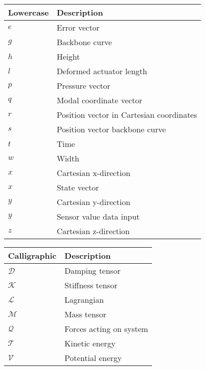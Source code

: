 \begin{spacing}{0.9}
\begin{multicols}{2}
\begin{table}[H]
\centering
    \begin{tabular}{p{1.7cm} p{4.8cm}} \hline
    \textbf{Lowercase}    &   \textbf{Description }\\ \hline
     $e$     & Error vector \\
     $g$     & Backbone curve \\
     $h$     & Height \\
     $l$     & Deformed actuator length \\
     $p$     & Pressure vector \\
     $q$     & Modal coordinate vector \\
     $r$     & Position vector in Cartesian coordinates \\
     $s$     & Position vector backbone curve \\
     $t$     & Time \\
     $w$     & Width \\
     $x$     & Cartesian x-direction \\
     $x$     & State vector \\
     $y$     & Cartesian y-direction \\
     $y$     & Sensor value data input \\
     $z$     & Cartesian z-direction \\ \hline
    \end{tabular}
\end{table}



\begin{table}[H]
\centering
    \begin{tabular}{p{2.5cm} p{4cm}} \hline
    \textbf{Calligraphic}    &   \textbf{Description }\\ \hline

    $\mathcal{D}$     &  Damping tensor \\
    $\mathcal{K}$     &  Stiffness tensor \\
    $\mathcal{L}$     &  Lagrangian \\
    $\mathcal{M}$     &  Mass tensor \\
    $\mathcal{Q}$     &  Forces acting on system \\
    $\mathcal{T}$     &  Kinetic energy \\
    $\mathcal{V}$     &  Potential energy \\ \hline
    \end{tabular}
\end{table}




\end{multicols}
\end{spacing}
